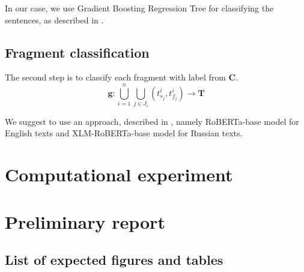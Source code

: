 \documentclass{article}
\begin{document}
In our case, we use Gradient Boosting Regression Tree for classifying the sentences, as described in \cite{Kuznetsov}.

\subsection{Fragment classification}

The second step is to classify each fragment with label from $\mathbf{C}$.
$$\mathbf{g}: \bigcup_{i=1}^{n}\bigcup_{j \in J_i}(t_{s_j}^i, t_{f_j}^i) \rightarrow \mathbf{T}$$

We suggest to use an approach, described in \cite{gritsay2022}, namely RoBERTa-base model for English texts and XLM-RoBERTa-base model for Russian texts.

\section{Computational experiment}
  
\section{Preliminary report}


\subsection{List of expected figures and tables}

\pagebreak


\end{document}
